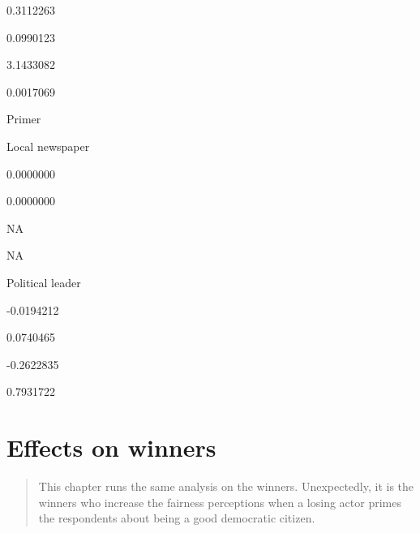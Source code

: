 \documentclass[]{book}
\begin{document}
0.3112263

0.0990123

3.1433082

0.0017069

Primer

Local newspaper

0.0000000

0.0000000

NA

NA

Political leader

-0.0194212

0.0740465

-0.2622835

0.7931722

\chapter{Effects on winners}\label{effects-on-winners-1}

\begin{quote}
This chapter runs the same analysis on the winners. Unexpectedly, it is
the winners who increase the fairness perceptions when a losing actor
primes the respondents about being a good democratic citizen.
\end{quote}
\end{document}
